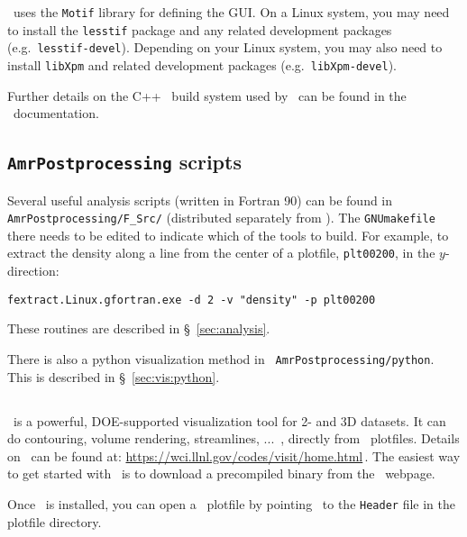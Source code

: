 \amrvis\ uses the {\tt Motif} library for defining the GUI.  On a Linux 
system, you may need to install the {\tt lesstif} package and any
related development packages (e.g.\ {\tt lesstif-devel}).  Depending
on your Linux system, you may also need to install {\tt libXpm} and
related development packages (e.g.\ {\tt libXpm-devel}).  

Further details on the C++ \boxlib\ build system used by \amrvis\
can be found in the \boxlib\ documentation.


\subsection{{\tt AmrPostprocessing} scripts}

Several useful analysis scripts (written in Fortran 90) can be found
in {\tt AmrPostprocessing/F\_Src/} (distributed separately
from \maestro).  The {\tt GNUmakefile} there needs to be edited to
indicate which of the tools to build.  For example, to extract the
density along a line from the center of a plotfile, {\tt plt00200}, in
the $y$-direction:

\begin{verbatim}
fextract.Linux.gfortran.exe -d 2 -v "density" -p plt00200
\end{verbatim}

These routines are described in \S~\ref{sec:analysis}.

There is also a python visualization method in {\tt
AmrPostprocessing/python}.  This is described
in \S~\ref{sec:vis:python}.


\subsection{\visit}

\visit\ is a powerful, DOE-supported visualization tool for 2- and 3D
datasets.  It can do contouring, volume rendering, streamlines, ...\, ,
directly from \boxlib\ plotfiles.   Details on
\visit\ can be found at:\newline
 \url{https://wci.llnl.gov/codes/visit/home.html}\,. \newline
The easiest way to get started with \visit\ is to download a precompiled
binary from the \visit\ webpage.

Once \visit\ is installed, you can open a \boxlib\ plotfile by pointing
\visit\ to the {\tt Header} file in the plotfile directory.


\subsection{\yt}

